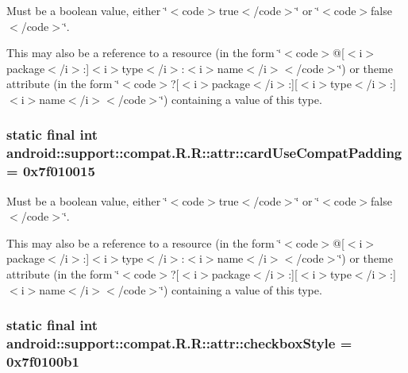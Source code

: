Must be a boolean value, either \char`\"{}$<$code$>$true$<$/code$>$\char`\"{} or \char`\"{}$<$code$>$false$<$/code$>$\char`\"{}. 

This may also be a reference to a resource (in the form \char`\"{}$<$code$>$@\mbox{[}$<$i$>$package$<$/i$>$:\mbox{]}$<$i$>$type$<$/i$>$:$<$i$>$name$<$/i$>$$<$/code$>$\char`\"{}) or theme attribute (in the form \char`\"{}$<$code$>$?\mbox{[}$<$i$>$package$<$/i$>$:\mbox{]}\mbox{[}$<$i$>$type$<$/i$>$:\mbox{]}$<$i$>$name$<$/i$>$$<$/code$>$\char`\"{}) containing a value of this type. \hypertarget{classandroid_1_1support_1_1compat_1_1_r_1_1attr_f839b2404bb64aa1923835c9d9f445e4}{
\subsubsection[{cardUseCompatPadding}]{\setlength{\rightskip}{0pt plus 5cm}static final int android::support::compat.R.R::attr::cardUseCompatPadding = 0x7f010015}}
\label{classandroid_1_1support_1_1compat_1_1_r_1_1attr_f839b2404bb64aa1923835c9d9f445e4}


Must be a boolean value, either \char`\"{}$<$code$>$true$<$/code$>$\char`\"{} or \char`\"{}$<$code$>$false$<$/code$>$\char`\"{}. 

This may also be a reference to a resource (in the form \char`\"{}$<$code$>$@\mbox{[}$<$i$>$package$<$/i$>$:\mbox{]}$<$i$>$type$<$/i$>$:$<$i$>$name$<$/i$>$$<$/code$>$\char`\"{}) or theme attribute (in the form \char`\"{}$<$code$>$?\mbox{[}$<$i$>$package$<$/i$>$:\mbox{]}\mbox{[}$<$i$>$type$<$/i$>$:\mbox{]}$<$i$>$name$<$/i$>$$<$/code$>$\char`\"{}) containing a value of this type. \hypertarget{classandroid_1_1support_1_1compat_1_1_r_1_1attr_b495d209321539cfdb3942c95804bc3a}{
\subsubsection[{checkboxStyle}]{\setlength{\rightskip}{0pt plus 5cm}static final int android::support::compat.R.R::attr::checkboxStyle = 0x7f0100b1}}
\label{classandroid_1_1support_1_1compat_1_1_r_1_1attr_b495d209321539cfdb3942c95804bc3a}


